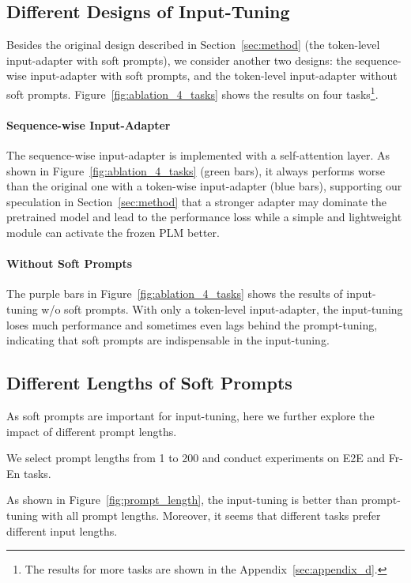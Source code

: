 \subsection{Different Designs of Input-Tuning} \label{sec:diff_input_adapters}
Besides the original design described in Section~\ref{sec:method} (the token-level input-adapter with soft prompts), we consider another two designs: the sequence-wise input-adapter with soft prompts, and the token-level input-adapter without soft prompts.
Figure~\ref{fig:ablation_4_tasks} shows the results on four tasks\footnote{The results for more tasks are shown in the Appendix~\ref{sec:appendix_d}.}.

\paragraph{Sequence-wise Input-Adapter} The sequence-wise input-adapter is implemented with a self-attention layer. As shown in Figure~\ref{fig:ablation_4_tasks} (\textcolor[rgb]{0,0.5,0}{green bars}), it always performs worse than the original one with a token-wise input-adapter (\textcolor[rgb]{0,0,0.7}{blue bars}), supporting our speculation in Section~\ref{sec:method} that a stronger adapter may dominate the pretrained model and lead to the performance loss while a simple and lightweight module can activate the frozen PLM better.

\paragraph{Without Soft Prompts} The \textcolor[rgb]{0.4,0.1,0.9}{purple bars} in Figure~\ref{fig:ablation_4_tasks} shows the results of input-tuning w/o soft prompts. With only a token-level input-adapter, the input-tuning loses much performance and sometimes even lags behind the prompt-tuning, indicating that soft prompts are indispensable in the input-tuning.

\subsection{Different Lengths of Soft Prompts} \label{sec:diff_prompt_length}
As soft prompts are important for input-tuning, here we further explore the impact of different prompt lengths.

We select prompt lengths from 1 to 200 and conduct experiments on E2E and Fr-En tasks.

As shown in Figure~\ref{fig:prompt_length}, the input-tuning is better than prompt-tuning with all prompt lengths. Moreover, it seems that different tasks prefer different input lengths.

